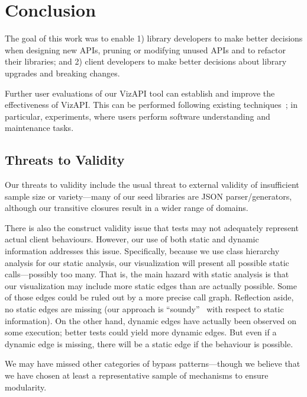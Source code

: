 \chapter{Conclusion}
\label{sec:conclusion}
The goal of this work was to enable 1) library developers to make better
decisions when designing new APIs, pruning or modifying unused APIs and to refactor their
libraries; and 2) client developers to make better decisions about library
upgrades and breaking changes.

Further user evaluations of our VizAPI tool can establish and improve the
effectiveness of VizAPI. This can be performed following
existing techniques~\cite{merino18:_system_liter_review_softw_visual_evaluat}; in
particular, experiments, where users perform software
understanding and maintenance tasks.


\section{Threats to Validity}
Our threats to validity include the usual threat to external validity
of insufficient sample size or variety---many of our seed libraries
are JSON parser/generators, although our transitive closures result in
a wider range of domains.

There is also the construct validity issue that tests may
not adequately represent actual client behaviours. However, our use of both static
and dynamic information addresses this issue. Specifically, because we use
class hierarchy analysis for our static analysis, our visualization will present
all possible static calls---possibly too many. 
That is, the main hazard with static analysis is that our visualization may include more
static edges than are actually possible. Some of those edges could be ruled out by a more
precise call graph. Reflection aside, no static edges
are missing (our approach is ``soundy''~\cite{livshits15:_in_defen_sound} with respect to static information). On the other hand, dynamic edges have actually been observed
on some execution; better tests could yield more dynamic edges. But even if
a dynamic edge is missing, there will be a static edge if the behaviour is possible.

We may have missed other categories of bypass patterns---though we believe
that we have chosen at least a representative sample of mechanisms to ensure
modularity. 

